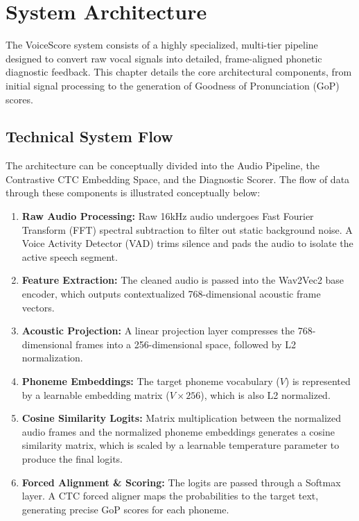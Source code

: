 \chapter{System Architecture}

The VoiceScore system consists of a highly specialized, multi-tier pipeline designed to convert raw vocal signals into detailed, frame-aligned phonetic diagnostic feedback. This chapter details the core architectural components, from initial signal processing to the generation of Goodness of Pronunciation (GoP) scores.

\section{Technical System Flow}
The architecture can be conceptually divided into the Audio Pipeline, the Contrastive CTC Embedding Space, and the Diagnostic Scorer. The flow of data through these components is illustrated conceptually below:

\begin{enumerate}
    \item \textbf{Raw Audio Processing:} Raw 16kHz audio undergoes Fast Fourier Transform (FFT) spectral subtraction to filter out static background noise. A Voice Activity Detector (VAD) trims silence and pads the audio to isolate the active speech segment.
    \item \textbf{Feature Extraction:} The cleaned audio is passed into the Wav2Vec2 base encoder, which outputs contextualized 768-dimensional acoustic frame vectors.
    \item \textbf{Acoustic Projection:} A linear projection layer compresses the 768-dimensional frames into a 256-dimensional space, followed by L2 normalization.
    \item \textbf{Phoneme Embeddings:} The target phoneme vocabulary ($V$) is represented by a learnable embedding matrix ($V \times 256$), which is also L2 normalized.
    \item \textbf{Cosine Similarity Logits:} Matrix multiplication between the normalized audio frames and the normalized phoneme embeddings generates a cosine similarity matrix, which is scaled by a learnable temperature parameter to produce the final logits.
    \item \textbf{Forced Alignment \& Scoring:} The logits are passed through a Softmax layer. A CTC forced aligner maps the probabilities to the target text, generating precise GoP scores for each phoneme.
\end{enumerate}

